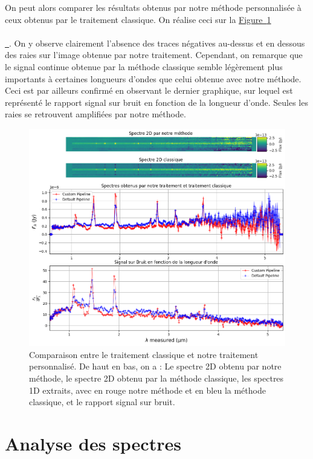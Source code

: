 \documentclass[12pt, a4paper]{article}
\newcommand*{\figref}[2][]{%
  \hyperref[{#2}]{%
    Figure~\ref*{#2}%
    \ifx\\#1\\%
    \else
      \,#1%
    \fi
  }%
}
\begin{document}
On peut alors comparer les résultats obtenus par notre méthode personnalisée à ceux obtenus par le traitement classique. On réalise ceci sur la \figref{fig:comparaison_mast_custom}. On y observe clairement l'absence des traces négatives au-dessus et en dessous des raies sur l'image obtenue par notre traitement. Cependant, on remarque que le signal continue obtenue par la méthode classique semble légèrement plus importants à certaines longueurs d'ondes que celui obtenue avec notre méthode. Ceci est par ailleurs confirmé en observant le dernier graphique, sur lequel est représenté le rapport signal sur bruit en fonction de la longueur d'onde. Seules les raies se retrouvent amplifiées par notre méthode.\\


\begin{figure}[!h]
  \centering
  \includegraphics[scale=0.7]{assets/comparaison_spectres_mast_custom.png}
  \caption{Comparaison entre le traitement classique et notre traitement personnalisé. De haut en bas, on a : Le spectre 2D obtenu par notre méthode, le spectre 2D obtenu par la méthode classique, les spectres 1D extraits, avec en rouge notre méthode et en bleu la méthode classique, et le rapport signal sur bruit.}
  \label{fig:comparaison_mast_custom}
\end{figure}

\section{Analyse des spectres}
\end{document}
